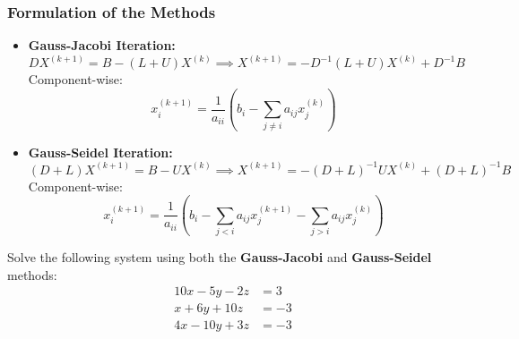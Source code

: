 \documentclass[11pt,a4paper]{article}
\begin{document}
\subsubsection{Formulation of the Methods}
\begin{itemize}
    \item \textbf{Gauss-Jacobi Iteration:}
    $$D X^{(k+1)} = B - (L + U) X^{(k)} \implies X^{(k+1)} = -D^{-1}(L+U)X^{(k)} + D^{-1}B$$
    Component-wise:
    \begin{equation}
        x_i^{(k+1)} = \frac{1}{a_{ii}}\left(b_i - \sum_{j \ne i} a_{ij} x_j^{(k)}\right)
    \end{equation}
    
    \item \textbf{Gauss-Seidel Iteration:}
    $$(D + L) X^{(k+1)} = B - U X^{(k)} \implies X^{(k+1)} = -(D+L)^{-1}U X^{(k)} + (D+L)^{-1}B$$
    Component-wise:
    \begin{equation}
        x_i^{(k+1)} = \frac{1}{a_{ii}}\left(b_i - \sum_{j < i} a_{ij} x_j^{(k+1)} - \sum_{j > i} a_{ij} x_j^{(k)}\right)
    \end{equation}
\end{itemize}

\begin{exambox}
Solve the following system using both the \textbf{Gauss-Jacobi} and \textbf{Gauss-Seidel} methods:
\begin{align}
    10x - 5y - 2z &= 3 \label{eq:sys1} \\
    x + 6y + 10z &= -3 \label{eq:sys2} \\
    4x - 10y + 3z &= -3 \label{eq:sys3}
\end{align}
\end{exambox}
\end{document}
